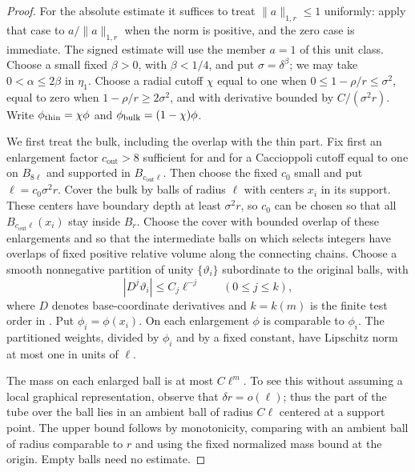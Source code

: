 \begin{proof}
For the absolute estimate it suffices to treat $\|a\|_{1,r}\leq1$
uniformly: apply that case to $a/\|a\|_{1,r}$ when the norm is positive,
and the zero case is immediate.  The signed estimate will use the member
$a=1$ of this unit class.
Choose a small fixed $\beta>0$, with $\beta<1/4$, and put
$\sigma=\delta^\beta$; we may take $0<\alpha\leq2\beta$ in $\eta_1$.
Choose a radial cutoff $\chi$ equal to one
when $0\leq1-\rho/r\leq\sigma^2$, equal to zero when
$1-\rho/r\geq2\sigma^2$, and with derivative bounded by
$C/(\sigma^2r)$.  Write $\phi_{\rm thin}=\chi\phi$ and
$\phi_{\rm bulk}=(1-\chi)\phi$.

We first treat the bulk, including the overlap with the thin part.
Fix first an enlargement factor $c_{\mathrm{out}}>8$ sufficient for
 and for a Caccioppoli cutoff equal to one on
$B_{8\ell}$ and supported in $B_{c_{\mathrm{out}}\ell}$.  Then choose
the fixed $c_0$ small and put $\ell=c_0\sigma^2r$.  Cover the bulk by
balls of radius $\ell$ with centers $x_i$ in its support.  These centers
have boundary depth at least $\sigma^2r$, so $c_0$ can be chosen so that
all $B_{c_{\mathrm{out}}\ell}(x_i)$ stay inside $B_r$.  Choose the cover
with bounded overlap of these enlargements and so that the intermediate
balls on which  selects integers have overlaps of fixed
positive relative volume along the connecting chains.  Choose a smooth
nonnegative partition of unity $\{\vartheta_i\}$ subordinate to the
original balls, with
\[
 |D^j\vartheta_i|\leq C_j\ell^{-j}\qquad(0\leq j\leq k),
\]
where $D$ denotes base-coordinate derivatives and $k=k(m)$ is the finite
test order in .  Put $\phi_i=\phi(x_i)$.  On each
enlargement $\phi$ is comparable to $\phi_i$.  The partitioned
weights, divided by $\phi_i$ and by a fixed constant,
have Lipschitz norm at most one in units of $\ell$.

The mass on each enlarged ball is at most $C\ell^m$.  To see this
without assuming a local graphical representation, observe that
$\delta r=o(\ell)$; thus the part of the tube over the ball lies in an
ambient ball of radius $C\ell$ centered at a support point.  The upper
bound follows by monotonicity, comparing with an ambient ball of radius
comparable to $r$ and using the fixed normalized mass bound at the
origin.  Empty balls need no estimate.


\end{proof}
